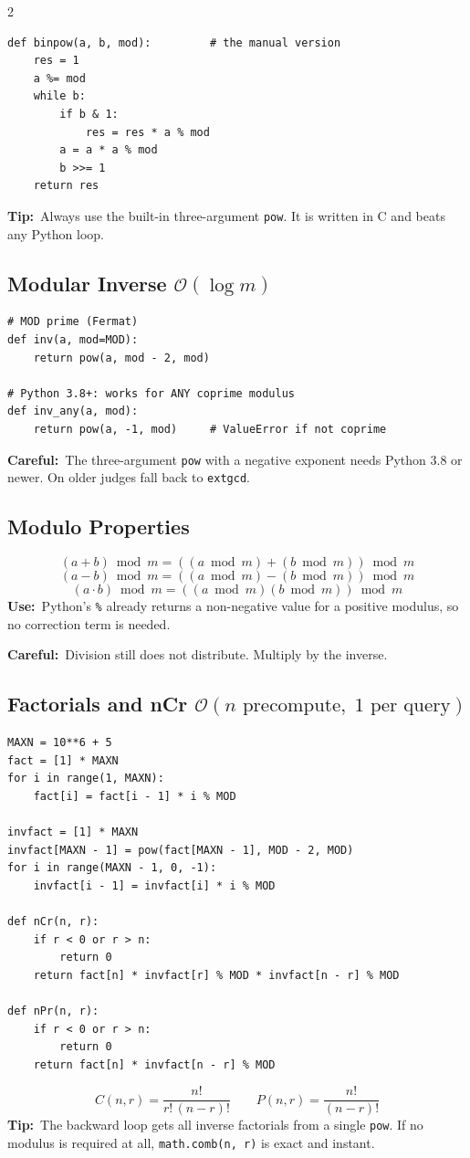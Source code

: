 \documentclass[10pt]{article}
\newcommand{\code}[1]{\texttt{\small #1}}
\newcommand{\sub}[2]{\subsection[#1]{#1\hspace{0.6em}%
  \textnormal{\color{accent2}\small$\mathcal{O}(#2)$}}}
\newcommand{\uses}[1]{{\color{accent2}\footnotesize\textbf{Use:}}~{\footnotesize #1}\par}
\newcommand{\tip}[1]{{\color{tipc}\footnotesize\textbf{Tip:}}~{\footnotesize #1}\par}
\newcommand{\warn}[1]{{\color{warnc}\footnotesize\textbf{Careful:}}~{\footnotesize #1}\par}
\begin{document}
\begin{multicols}{2}
\begin{lstlisting}
def binpow(a, b, mod):         # the manual version
    res = 1
    a %= mod
    while b:
        if b & 1:
            res = res * a % mod
        a = a * a % mod
        b >>= 1
    return res
\end{lstlisting}
\tip{Always use the built-in three-argument \code{pow}. It is written in
C and beats any Python loop.}

\sub{Modular Inverse}{\log m}
\begin{lstlisting}
# MOD prime (Fermat)
def inv(a, mod=MOD):
    return pow(a, mod - 2, mod)

# Python 3.8+: works for ANY coprime modulus
def inv_any(a, mod):
    return pow(a, -1, mod)     # ValueError if not coprime
\end{lstlisting}
\warn{The three-argument \code{pow} with a negative exponent needs
Python 3.8 or newer. On older judges fall back to \code{extgcd}.}

\subsection{Modulo Properties}
\[(a+b)\bmod m=((a\bmod m)+(b\bmod m))\bmod m\]
\[(a-b)\bmod m=((a\bmod m)-(b\bmod m))\bmod m\]
\[(a \cdot b)\bmod m=((a\bmod m)(b\bmod m))\bmod m\]
\uses{Python's \code{\%} already returns a non-negative value for a
positive modulus, so no correction term is needed.}
\warn{Division still does not distribute. Multiply by the inverse.}

\sub{Factorials and nCr}{n \text{ precompute},\; 1 \text{ per query}}
\begin{lstlisting}
MAXN = 10**6 + 5
fact = [1] * MAXN
for i in range(1, MAXN):
    fact[i] = fact[i - 1] * i % MOD

invfact = [1] * MAXN
invfact[MAXN - 1] = pow(fact[MAXN - 1], MOD - 2, MOD)
for i in range(MAXN - 1, 0, -1):
    invfact[i - 1] = invfact[i] * i % MOD

def nCr(n, r):
    if r < 0 or r > n:
        return 0
    return fact[n] * invfact[r] % MOD * invfact[n - r] % MOD

def nPr(n, r):
    if r < 0 or r > n:
        return 0
    return fact[n] * invfact[n - r] % MOD
\end{lstlisting}
\[C(n,r) = \frac{n!}{r!\,(n-r)!} \qquad P(n,r) = \frac{n!}{(n-r)!}\]
\tip{The backward loop gets all inverse factorials from a single
\code{pow}. If no modulus is required at all, \code{math.comb(n, r)} is
exact and instant.}


\end{multicols}
\end{document}
